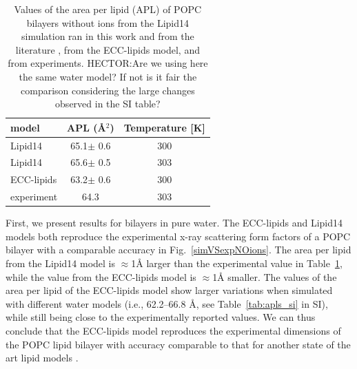 \documentclass[aip,jcp,twocolumn]{revtex4}
\begin{document}
\begin{table}[tb!]
  \caption{Values of the area per lipid (APL) of POPC bilayers without ions from the Lipid14 simulation
    ran in this work and from the literature \cite{dickson14}, from the ECC-lipids model, and from experiments.{ \color{red} HECTOR:Are we using here the same water model? If not is it fair the comparison considering the large changes observed in the SI table?}\label{tab:apls} }
  \begin{tabular}{l|c c}
    model          & APL (\AA$^2$)   & Temperature [K] \\
    \hline
    Lipid14                   & 65.1$\pm$ 0.6  &  300 \\
    Lipid14 \cite{dickson14}  & 65.6$\pm$ 0.5  &  303 \\
    \hline
    ECC-lipids                & {\color{red}63.2}$\pm$ 0.6  &  300       \\
    \hline
    experiment \cite{kucerka11} & 64.3  &  303    \\
    \hline
  \end{tabular}
\end{table}


First, we present results for bilayers in pure water.
The ECC-lipids and Lipid14 models both reproduce the experimental x-ray scattering form factors
of a POPC bilayer with a comparable accuracy in Fig.~\ref{simVSexpNOions}.
The area per lipid from the Lipid14 model is $\approx$1\AA{} larger than the
experimental value in Table~\ref{tab:apls}, while the value from the ECC-lipids model
is $\approx$1\AA{} smaller. The values of the area per lipid of the ECC-lipids model show larger variations
when simulated with different water models (i.e., 62.2--66.8 \AA{}, see Table~\ref{tab:apls_si} in SI),
while still being close to the experimentally reported values.
We can thus conclude that the ECC-lipids model reproduces the experimental dimensions of the POPC
lipid bilayer with accuracy comparable to that for another state of the art lipid models \cite{ollila16}.
\end{document}
